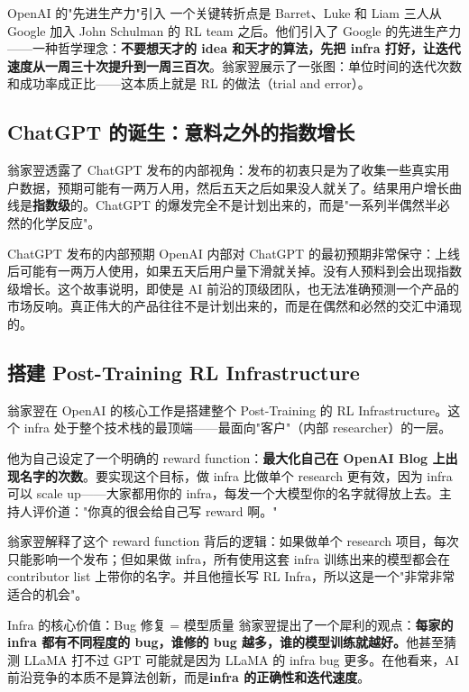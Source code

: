 \documentclass[a4paper]{article}
\begin{document}
\begin{importantbox}{OpenAI 的"先进生产力"引入}
一个关键转折点是 Barret、Luke 和 Liam 三人从 Google 加入 John Schulman 的 RL team 之后。他们引入了 Google 的先进生产力——一种哲学理念：\textbf{不要想天才的 idea 和天才的算法，先把 infra 打好，让迭代速度从一周三十次提升到一周三百次}。翁家翌展示了一张图：单位时间的迭代次数和成功率成正比——这本质上就是 RL 的做法（trial and error）。
\end{importantbox}

\subsection{ChatGPT 的诞生：意料之外的指数增长}

翁家翌透露了 ChatGPT 发布的内部视角：发布的初衷只是为了收集一些真实用户数据，预期可能有一两万人用，然后五天之后如果没人就关了。结果用户增长曲线是\textbf{指数级}的。ChatGPT 的爆发完全不是计划出来的，而是"一系列半偶然半必然的化学反应"。

\begin{knowledgebox}{ChatGPT 发布的内部预期}
OpenAI 内部对 ChatGPT 的最初预期非常保守：上线后可能有一两万人使用，如果五天后用户量下滑就关掉。没有人预料到会出现指数级增长。这个故事说明，即使是 AI 前沿的顶级团队，也无法准确预测一个产品的市场反响。真正伟大的产品往往不是计划出来的，而是在偶然和必然的交汇中涌现的。
\end{knowledgebox}

\subsection{搭建 Post-Training RL Infrastructure}

翁家翌在 OpenAI 的核心工作是搭建整个 Post-Training 的 RL Infrastructure。这个 infra 处于整个技术栈的最顶端——最面向"客户"（内部 researcher）的一层。

他为自己设定了一个明确的 reward function：\textbf{最大化自己在 OpenAI Blog 上出现名字的次数}。要实现这个目标，做 infra 比做单个 research 更有效，因为 infra 可以 scale up——大家都用你的 infra，每发一个大模型你的名字就得放上去。主持人评价道："你真的很会给自己写 reward 啊。"

翁家翌解释了这个 reward function 背后的逻辑：如果做单个 research 项目，每次只能影响一个发布；但如果做 infra，所有使用这套 infra 训练出来的模型都会在 contributor list 上带你的名字。并且他擅长写 RL Infra，所以这是一个"非常非常适合的机会"。

\begin{importantbox}{Infra 的核心价值：Bug 修复 = 模型质量}
翁家翌提出了一个犀利的观点：\textbf{每家的 infra 都有不同程度的 bug，谁修的 bug 越多，谁的模型训练就越好。}他甚至猜测 LLaMA 打不过 GPT 可能就是因为 LLaMA 的 infra bug 更多。在他看来，AI 前沿竞争的本质不是算法创新，而是\textbf{infra 的正确性和迭代速度}。
\end{importantbox}
\end{document}
